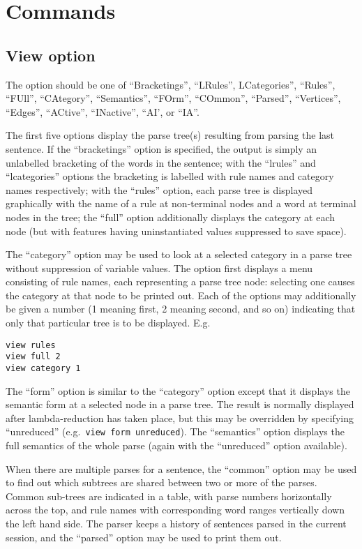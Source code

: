 \section{Commands}

\subsection{View option}

The option should be one of ``Bracketings'', ``LRules'', LCategories'',
``Rules'', ``FUll'', ``CAtegory'', ``Semantics'', ``FOrm'',
``COmmon'', ``Parsed'', ``Vertices'', ``Edges'', ``ACtive'',
``INactive'', ``AI', or ``IA''. 

The first five options display the parse tree(s) resulting from parsing
the last sentence. If the ``bracketings'' option is
specified, the output is simply an unlabelled bracketing of the words in
the sentence; with the ``lrules'' and ``lcategories'' options the bracketing
is labelled with rule names and category names respectively; with the ``rules''
option, each parse tree is displayed graphically with the name of a rule
at non-terminal nodes and a word at terminal nodes in the tree;
the ``full'' option additionally displays the category at each node (but
with features having uninstantiated values suppressed to save space).

The ``category'' option may be used to look at a selected
category in a parse tree without suppression of variable values.
The option first displays a menu consisting of rule names, each
representing a parse tree node: selecting one causes the category at
that node to be printed out.  Each of the options may additionally be
given a number (1 meaning first, 2 meaning second, and so on)
indicating that only that particular tree is to be displayed. E.g.
\begin{ex}
\begin{verbatim}
view rules
view full 2
view category 1
\end{verbatim}
\end{ex}
The ``form'' option is similar to the ``category'' option except that
it displays the semantic form at a selected node in a parse tree. The result
is normally displayed after lambda-reduction has taken place, but this
may be overridden by specifying ``unreduced'' (e.g.\ {\tt view form unreduced}).
The ``semantics'' option displays the full semantics of the whole
parse (again with the ``unreduced'' option available).

When there are multiple parses for a sentence, the ``common'' option may
be used to find out which subtrees are shared between two or more of the
parses.  Common sub-trees are indicated in a table, with parse numbers
horizontally across the top, and rule names with corresponding word
ranges vertically down the left hand side. The parser keeps a history
of sentences parsed in the current session, and the ``parsed'' option
may be used to print them out.

